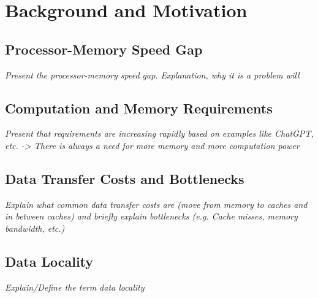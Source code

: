 \section{Background and Motivation}\label{sec:background}

\subsection{Processor-Memory Speed Gap}\label{sec:pmgap}
\textit{Present the processor-memory speed gap. Explanation, why it is a problem will }

\subsection{Computation and Memory Requirements}\label{sec:comp_mem_req}
\textit{Present that requirements are increasing rapidly based on examples like ChatGPT, etc. -> There is always a need for more memory and more computation power}

\subsection{Data Transfer Costs and Bottlenecks}\label{sec:data_transfer}
\textit{Explain what common data transfer costs are (move from memory to caches and in between caches) and briefly explain bottlenecks (e.g. Cache misses, memory bandwidth, etc.)}

\subsection{Data Locality}\label{sec:data_locality}
\textit{Explain/Define the term data locality}

